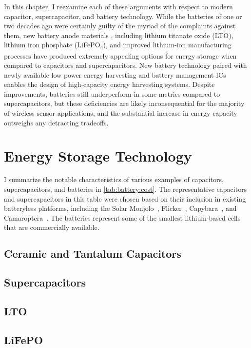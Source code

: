 In this chapter, I reexamine each of these arguments with respect to modern capacitor, supercapacitor, and battery technology. 
While the batteries of one or two decades ago were certainly guilty of the myriad of the complaints against them, new 
battery anode materials
, including lithium titanate oxide (LTO), 
lithium iron phosphate (LiFePO\textsubscript{4}), and improved lithium-ion manufacturing processes have produced extremely appealing options for energy storage when compared to capacitors and supercapacitors. 
New battery technology paired with newly available low power energy harvesting and battery management ICs~\cite{bq25505} enables the design of high-capacity energy harvesting systems.
Despite improvements, batteries still underperform in some metrics compared to supercapacitors, but these deficiencies are likely inconsequential for the majority of wireless sensor applications, and the substantial increase in energy capacity outweighs any detracting tradeoffs.\\


\section{Energy Storage Technology}
\label{sec:battery-new}

I summarize the notable characteristics of various examples of capacitors, supercapacitors, and batteries in \cref{tab:battery:cost}. The representative capacitors and supercapacitors in this table were chosen based on their inclusion in existing batteryless platforms, including the Solar Monjolo~\cite{campbellEnergy14}, Flicker~\cite{hesterFlicker17}, Capybara~\cite{colinReconfigurable18}, and Camaroptera~\cite{nardello2019camaroptera}.
The batteries represent some of the smallest lithium-based cells that are commercially available. 

\subsection{Ceramic and Tantalum Capacitors}
\subsection{Supercapacitors}
\subsection{LTO}
\subsection{LiFePO}

